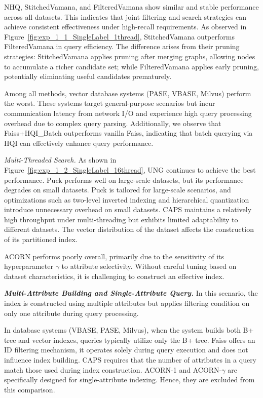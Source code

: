 \documentclass[sigconf, nonacm]{acmart}
\begin{document}
\begin{sloppypar}
NHQ, StitchedVamana, and FilteredVamana show similar and stable performance across all datasets. This indicates that joint filtering and search strategies can achieve consistent effectiveness under high-recall requirements. As observed in Figure~\ref{fig:exp_1_1_SingleLabel_1thread}, StitchedVamana outperforms FilteredVamana in query efficiency. The difference arises from their pruning strategies: StitchedVamana applies pruning after merging graphs, allowing nodes to accumulate a richer candidate set; while FilteredVamana applies early pruning, potentially eliminating useful candidates prematurely.

Among all methods, vector database systems (PASE, VBASE, Milvus) perform the worst. These systems target general-purpose scenarios but incur communication latency from network I/O and experience high query processing overhead due to complex query parsing. Additionally, we observe that Faiss+HQI\_Batch outperforms vanilla Faiss, indicating that batch querying via HQI can effectively enhance query performance.

\textit{Multi-Threaded Search.}
As shown in Figure~\ref{fig:exp_1_2_SingleLabel_16thread}, UNG continues to achieve the best performance. Puck performs well on large-scale datasets, but its performance degrades on small datasets. Puck is tailored for large-scale scenarios, and optimizations such as two-level inverted indexing and hierarchical quantization introduce unnecessary overhead on small datasets. 
CAPS maintains a relatively high throughput under multi-threading but exhibits limited adaptability to different datasets. The vector distribution of the dataset affects the construction of its partitioned index.

ACORN performs poorly overall, primarily due to the sensitivity of its hyperparameter $\gamma$ to attribute selectivity. Without careful tuning based on dataset characteristics, it is challenging to construct an effective index.

\vspace{1em}
\textit{\textbf{Multi-Attribute Building and Single-Attribute Query.}}
In this scenario, the index is constructed using multiple attributes but applies filtering condition on only one attribute during query processing.

In database systems (VBASE, PASE, Milvus), when the system builds both B+ tree and vector indexes, queries typically utilize only the B+ tree. Faiss offers an ID filtering mechanism, it operates solely during query execution and does not influence index building. CAPS requires that the number of attributes in a query match those used during index construction. ACORN-1 and ACORN-\(\gamma\) are specifically designed for single-attribute indexing. Hence, they are excluded from this comparison.


\end{sloppypar}
\end{document}
